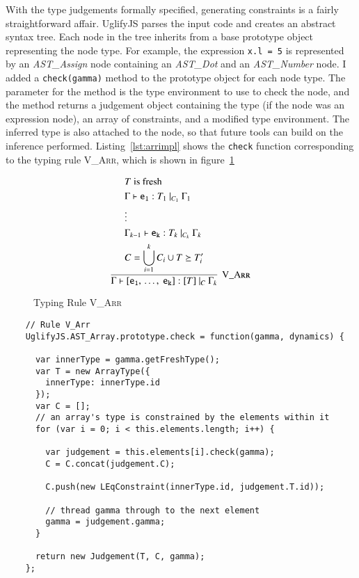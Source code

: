 \documentclass[12pt,a4paper,twoside,openright]{report}
\newcommand*{\js}{\texttt}
\begin{document}
With the type judgements formally specified, generating constraints is a fairly
straightforward affair.  UglifyJS parses the input code and creates an abstract
syntax tree. Each node in the tree inherits from a base prototype object
representing the node type.  For example, the expression \js{x.l = 5} is
represented by an \textit{AST\_Assign} node containing an \textit{AST\_Dot} and
an \textit{AST\_Number} node.  I added a \js{check(gamma)} method to the
prototype object for each node type. The parameter for the method is the type
environment to use to check the node, and the method returns a judgement object
containing the type (if the node was an expression node), an array of
constraints, and a modified type environment. The inferred type is also
attached to the node, so that future tools can build on the inference
performed. Listing~\ref{lst:arrimpl} shows the \js{check} function
corresponding to the typing rule \textsc{V\_Arr}, which is shown in figure~\ref{fig:arrrule}
\begin{figure}[t]
$$\infer[\textsc{V\_Arr}]{
  \Gamma\vdash\mathtt{[e_1,\, \ldots,\ e_k]}:[T]\ |_C\ \Gamma_k	
}{ 
	\begin{split}
		&T \textrm{ is fresh} \\
		&\Gamma\vdash \mathtt{e_1}:T_1\ |_{C_1}\ \Gamma_1 \\
		&\vdots \\
		&\Gamma_{k-1}\vdash \mathtt{e_k}:T_k\ |_{C_k}\ \Gamma_k \\
		&C=\bigcup_{i=1}^kC_i \cup {T \succeq T_i'}
	\end{split}	  
}$$
\label{fig:arrrule}
\caption{Typing Rule \textsc{V\_Arr}}
\end{figure}
\begin{program}[t]
 \begin{verbatim}
    // Rule V_Arr
    UglifyJS.AST_Array.prototype.check = function(gamma, dynamics) {

      var innerType = gamma.getFreshType();
      var T = new ArrayType({
        innerType: innerType.id
      });
      var C = [];
      // an array's type is constrained by the elements within it
      for (var i = 0; i < this.elements.length; i++) {

        var judgement = this.elements[i].check(gamma);
        C = C.concat(judgement.C);

        C.push(new LEqConstraint(innerType.id, judgement.T.id));

        // thread gamma through to the next element
        gamma = judgement.gamma;
      }
 
      return new Judgement(T, C, gamma);
    };
 \end{verbatim}
 \caption{The implementation of \textsc{V\_Arr}}\label{lst:arrimpl}
\end{program}
\end{document}
